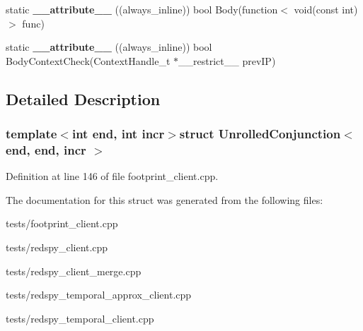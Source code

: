 \begin{DoxyCompactItemize}
\item 
\hypertarget{structUnrolledConjunction_3_01end_00_01end_00_01incr_01_4_adce5a34e74f011f45f5de2c5fb0087dc}{static {\bfseries \-\_\-\-\_\-attribute\-\_\-\-\_\-} ((always\-\_\-inline)) bool Body(function$<$ void(const int)$>$ func)}\label{structUnrolledConjunction_3_01end_00_01end_00_01incr_01_4_adce5a34e74f011f45f5de2c5fb0087dc}

\item 
\hypertarget{structUnrolledConjunction_3_01end_00_01end_00_01incr_01_4_a2ec2f1e021e2ac05cd6790b3787df39b}{static {\bfseries \-\_\-\-\_\-attribute\-\_\-\-\_\-} ((always\-\_\-inline)) bool Body\-Context\-Check(Context\-Handle\-\_\-t $\ast$\-\_\-\-\_\-restrict\-\_\-\-\_\- prev\-I\-P)}\label{structUnrolledConjunction_3_01end_00_01end_00_01incr_01_4_a2ec2f1e021e2ac05cd6790b3787df39b}

\end{DoxyCompactItemize}


\subsection{Detailed Description}
\subsubsection*{template$<$int end, int incr$>$struct Unrolled\-Conjunction$<$ end, end, incr $>$}



Definition at line 146 of file footprint\-\_\-client.\-cpp.



The documentation for this struct was generated from the following files\-:\begin{DoxyCompactItemize}
\item 
tests/footprint\-\_\-client.\-cpp\item 
tests/redspy\-\_\-client.\-cpp\item 
tests/redspy\-\_\-client\-\_\-merge.\-cpp\item 
tests/redspy\-\_\-temporal\-\_\-approx\-\_\-client.\-cpp\item 
tests/redspy\-\_\-temporal\-\_\-client.\-cpp\end{DoxyCompactItemize}

